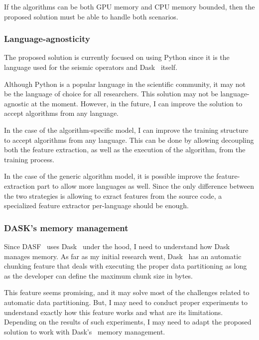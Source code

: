 If the algorithms can be both \ac{GPU} memory and \ac{CPU} memory bounded, then the proposed solution must be able to handle both scenarios.

\subsubsection{Language-agnosticity}

The proposed solution is currently focused on using Python since it is the language used for the seismic operators and Dask~\cite{dask} itself.

Although Python is a popular language in the scientific community, it may not be the language of choice for all researchers.
This solution may not be language-agnostic at the moment.
However, in the future, I can improve the solution to accept algorithms from any language.

In the case of the algorithm-specific model, I can improve the training structure to accept algorithms from any language.
This can be done by allowing decoupling both the feature extraction, as well as the execution of the algorithm, from the training process.

In the case of the generic algorithm model, it is possible improve the feature-extraction part to allow more languages as well.
Since the only difference between the two strategies is allowing to exract features from the source code, a specialized feature extractor per-language should be enough.

\subsubsection{DASK's memory management}

Since \ac{DASF}~\cite{dasf} uses Dask~\cite{dask} under the hood, I need to understand how Dask~\cite{dask} manages memory.
As far as my initial research went, Dask~\cite{dask} has an automatic chunking feature that deals with executing the proper data partitioning as long as the developer can define the maximum chunk size in bytes.

This feature seems promising, and it may solve most of the challenges related to automatic data partitioning.
But, I may need to conduct proper experiments to understand exactly how this feature works and what are its limitations.
Depending on the results of such experiments, I may need to adapt the proposed solution to work with Dask's~\cite{dask} memory management.
